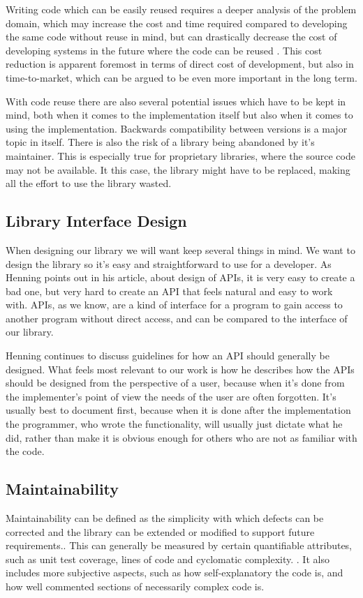 \documentclass{sigchi-alternate}
\begin{document}
Writing code which can be easily reused requires a deeper analysis of the problem domain, which may increase the cost and time required compared 
to developing the same code without reuse in mind, but can drastically decrease the cost of developing systems in the future where the code can 
be reused \autocite{lim1994effects}. This cost reduction is apparent foremost in terms of direct cost of development, but also in time-to-market, 
which can be argued to be even more important in the long term\autocite{griss1993software}.

With code reuse there are also several potential issues which have to be kept in mind, both when it comes to the implementation itself but also 
when it comes to using the implementation. Backwards compatibility between versions is a major topic in itself\autocite{raemaekers2012measuring}. There 
is also the risk of a library being abandoned by it’s maintainer. This is especially true for proprietary libraries, where the source code may not 
be available. It this case, the library might have to be replaced, making all the effort to use the library wasted.

\subsection{Library Interface Design}
When designing our library we will want keep several things in mind. We want to design the library so it’s easy and straightforward to use for a 
developer. As Henning points out in his article\autocite{Henning:2007:ADM:1255421.1255422}, about design of APIs, it is very easy to create a bad one, 
but very hard to create an API that feels natural and easy to work with. APIs, as we know, are a kind of interface for a program to gain access to 
another program without direct access, and can be compared to the interface of our library.

Henning continues to discuss guidelines for how an API should generally be designed. What feels most relevant to our work is how 
he describes how the APIs should be designed from the perspective of a user, because when it’s done from the implementer's point of view the 
needs of the user are often forgotten. It’s usually best to document first, because when it is done after the implementation the programmer, who 
wrote the functionality, will usually just dictate what he did, rather than make it is obvious enough for others who are not as familiar with the code.

\subsection{Maintainability}
Maintainability can be defined as the simplicity with which defects can be corrected and the library can be extended or modified to support future 
requirements.\autocite{5733835}. This can generally be measured by certain quantifiable attributes, such as unit test coverage, lines of code and cyclomatic complexity.
\autocite{SONARQUBE_MAINTAINABILITY_DEFINITION}. It also includes more subjective aspects, such as how self-explanatory the code is, and how well commented sections
of necessarily complex code is.
\end{document}
